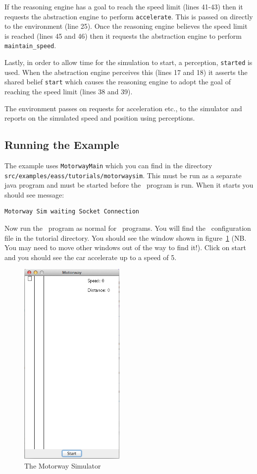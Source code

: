 If the reasoning engine has a goal to reach the speed limit (lines 41-43) then it requests the abstraction engine to perform \lstinline{accelerate}.  This is passed on directly to the environment (line 25).  Once the reasoning engine believes the speed limit is reached (lines 45 and 46) then it requests the abstraction engine to perform \lstinline{maintain_speed}.

Lastly, in order to allow time for the simulation to start, a perception, \lstinline{started} is used.  When the abstraction engine perceives this (lines 17 and 18) it asserts the shared belief \lstinline{start} which causes the reasoning engine to adopt the goal of reaching the speed limit (lines 38 and 39).

The environment passes on requests for acceleration etc., to the simulator and reports on the simulated speed and position using perceptions.

\subsection{Running the Example}

The example uses \texttt{MotorwayMain} which you can find in the directory \texttt{src/examples/eass/tutorials/motorwaysim}.  This must be run as a separate java program and must be started before the \eass\ program is run.  When it starts you should see message:

\begin{verbatim}
Motorway Sim waiting Socket Connection
\end{verbatim}

Now run the \eass\ program as normal for \ail\ programs.  You will find the \ail\ configuration file in the tutorial directory.  You should see the window shown in figure~\ref{fig:motorwaysim} (NB.  You may need to move other windows out of the way to find it!).  Click on start and you should see the car accelerate up to a speed of 5.

\begin{figure}
\begin{center}
\includegraphics[width=2in]{images/EASSmotorwaysim.png}
\end{center}
\caption{The Motorway Simulator}
\label{fig:motorwaysim}
\end{figure}

